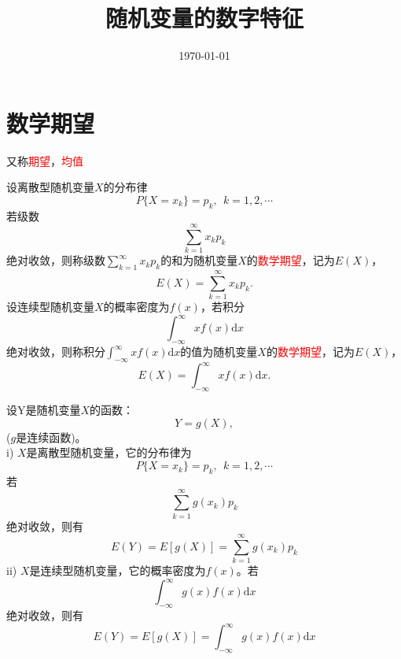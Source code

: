 \documentclass[12pt,a4paper]{article}
\title{随机变量的数字特征}
\author{}
\date{\today}
\newcommand{\dif}{\mathrm{d}}
\begin{document}
\maketitle

\section{数学期望}
又称\textcolor{red}{期望}，\textcolor{red}{均值} 

设离散型随机变量$X$的分布律
\begin{equation}
P\{X= x_k\} = p_k, ~~k = 1,2, \cdots
\end{equation}
若级数
\begin{equation}
\sum_{k=1}^{\infty} x_k p_k
\end{equation}
绝对收敛，则称级数$\sum_{k=1}^{\infty} x_k p_k$的和为随机变量$X$的\textcolor{red}{数学期望}，记为$E(X)$，
\begin{equation}
E(X) = \sum_{k=1}^{\infty} x_k p_k .
\end{equation}
设连续型随机变量$X$的概率密度为$f(x)$，若积分
\begin{equation}
\int_{-\infty}^{\infty} xf(x) \dif x
\end{equation}
绝对收敛，则称积分$\int_{-\infty}^{\infty} xf(x) \dif x$的值为随机变量$X$的\textcolor{red}{数学期望}，记为$E(X)$，
\begin{equation}
E(X) = \int_{-\infty}^{\infty} xf(x) \dif x .
\end{equation}

设Y是随机变量$X$的函数：
\begin{equation}
Y = g(X),
\end{equation}
($g$是连续函数)。\\
i) $X$是离散型随机变量，它的分布律为
\begin{equation}
P\{X= x_k\} = p_k, ~~k = 1,2, \cdots
\end{equation}
若
\begin{equation}
\sum_{k=1}^{\infty} g(x_k) p_k
\end{equation}
绝对收敛，则有
\begin{equation}
E(Y) = E[g(X)] = \sum_{k=1}^{\infty} g(x_k) p_k 
\end{equation}
ii) $X$是连续型随机变量，它的概率密度为$f(x)$。若
\begin{equation}
\int_{-\infty}^{\infty}  g(x) f(x) \dif x 
\end{equation}
绝对收敛，则有
\begin{equation}
E(Y) = E[g(X)] = \int_{-\infty}^{\infty} g(x) f(x) \dif x
\end{equation}
\end{document}
